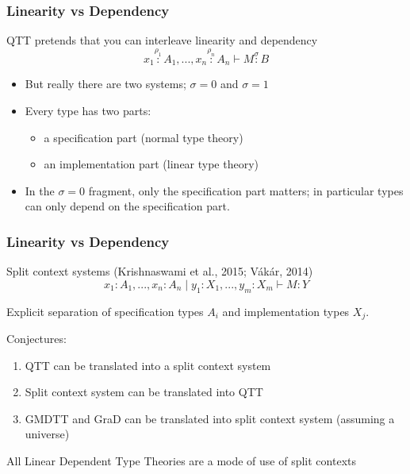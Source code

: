 \documentclass[xetex,serif,mathserif,aspectratio=169]{beamer}
\newcommand{\citationgrey}[1]{\textcolor{black!60}{#1}}
\begin{document}
\begin{frame}
  \frametitle{Linearity vs Dependency}

  QTT pretends that you can interleave linearity and dependency
  \begin{displaymath}
    x_1 \stackrel{\rho_1}: A_1, ..., x_n \stackrel{\rho_n}: A_n \vdash M \stackrel\sigma: B
  \end{displaymath}
  \begin{itemize}
  \item But really there are two systems; $\sigma = 0$ and $\sigma = 1$
  \item Every type has two parts:
    \begin{itemize}
    \item a specification part (normal type theory)
    \item an implementation part (linear type theory)
    \end{itemize}
  \item In the $\sigma = 0$ fragment, only the specification part
    matters; in particular types can only depend on the specification
    part.
  \end{itemize}
\end{frame}

\begin{frame}
  \frametitle{Linearity vs Dependency}

  Split context systems \citationgrey{(Krishnaswami et al., 2015; V{\'a}k{\'a}r, 2014)}
  \begin{displaymath}
    x_1 : A_1, ..., x_n : A_n \mid y_1 : X_1, ..., y_m : X_m \vdash M : Y
  \end{displaymath}

  \bigskip
  Explicit separation of specification types $A_i$ and implementation types $X_j$.

  \bigskip
  Conjectures:
  \begin{enumerate}
  \item QTT can be translated into a split context system
  \item Split context system can be translated into QTT \\
  \item GMDTT and GraD can be translated into split context system
    (assuming a universe)
  \end{enumerate}

  \pause
  \begin{center}
    {\Large All Linear Dependent Type Theories are a mode of use
      of split contexts}
  \end{center}
\end{frame}
\end{document}
